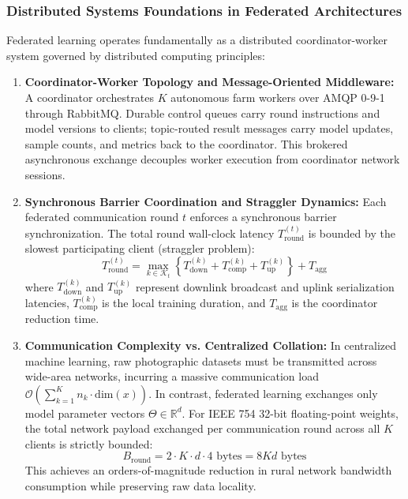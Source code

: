 \documentclass[applsci,article,submit,oneauthor,pdftex]{Definitions/mdpi}
\begin{document}
\subsubsection{Distributed Systems Foundations in Federated Architectures}
Federated learning operates fundamentally as a distributed coordinator-worker system governed by distributed computing principles:
\begin{enumerate}[leftmargin=*]
    \item \textbf{Coordinator-Worker Topology and Message-Oriented Middleware:} A coordinator orchestrates $K$ autonomous farm workers over AMQP 0-9-1 through RabbitMQ. Durable control queues carry round instructions and model versions to clients; topic-routed result messages carry model updates, sample counts, and metrics back to the coordinator. This brokered asynchronous exchange decouples worker execution from coordinator network sessions.
    \item \textbf{Synchronous Barrier Coordination and Straggler Dynamics:} Each federated communication round $t$ enforces a synchronous barrier synchronization. The total round wall-clock latency $T_{\text{round}}^{(t)}$ is bounded by the slowest participating client (straggler problem):
    \begin{equation}
    T_{\text{round}}^{(t)} = \max_{k \in \mathcal{K}_t} \left\{ T_{\text{down}}^{(k)} + T_{\text{comp}}^{(k)} + T_{\text{up}}^{(k)} \right\} + T_{\text{agg}}
    \label{eq:round_barrier}
    \end{equation}
    where $T_{\text{down}}^{(k)}$ and $T_{\text{up}}^{(k)}$ represent downlink broadcast and uplink serialization latencies, $T_{\text{comp}}^{(k)}$ is the local training duration, and $T_{\text{agg}}$ is the coordinator reduction time.
    \item \textbf{Communication Complexity vs. Centralized Collation:} In centralized machine learning, raw photographic datasets must be transmitted across wide-area networks, incurring a massive communication load $\mathcal{O}\left(\sum_{k=1}^K n_k \cdot \text{dim}(x)\right)$. In contrast, federated learning exchanges only model parameter vectors $\Theta \in \mathbb{R}^d$. For IEEE 754 32-bit floating-point weights, the total network payload exchanged per communication round across all $K$ clients is strictly bounded:
    \begin{equation}
    B_{\text{round}} = 2 \cdot K \cdot d \cdot 4 \text{ bytes} = 8Kd \text{ bytes}
    \label{eq:comm_payload}
    \end{equation}
    This achieves an orders-of-magnitude reduction in rural network bandwidth consumption while preserving raw data locality.

\end{enumerate}
\end{document}
